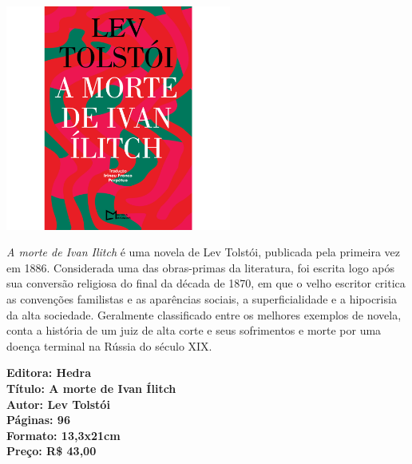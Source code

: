 \pagebreak

\begin{center}
\hspace*{-3.6cm}
\hspace*{3.1cm}\includegraphics[width=74mm]{./grid/ivan.png}
\end{center}

\hspace*{-7cm}\hrulefill\hspace*{-7cm}

\medskip

\noindent{}\textit{A morte de Ivan Ilitch} é uma novela de Lev Tolstói, publicada pela primeira vez em 1886. Considerada uma das obras-primas da literatura, foi escrita logo após sua conversão religiosa do final da década de 1870, em que o velho escritor critica as convenções familistas e as aparências sociais, a superficialidade e a hipocrisia da alta sociedade. Geralmente classificado entre os melhores exemplos de novela, conta a história de um juiz de alta corte e seus sofrimentos e morte por uma doença terminal na Rússia do século XIX.
\vfill

\noindent\begin{minipage}[c]{1\linewidth}
{\small\textbf{
\hspace*{-.1cm}Editora: Hedra\\
Título: A morte de Ivan Ílitch\\
Autor: Lev Tolstói\\ 
Páginas: 96\\
Formato: 13,3x21cm\\
Preço: R\$ 43,00\\
}}
\end{minipage}

